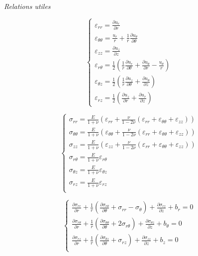 \documentclass
[
a4paper,                      %
twoside,					  %
12pt,                         %
abstract,		      %
fleqn,                        %
]
{scrartcl} %
\begin{document}
\textit{Relations utiles}

\begin{equation}
\begin{cases}
\varepsilon_{rr}=\frac{\partial u_{r}}{\partial r}\\
\varepsilon_{\theta\theta}=\frac{u_{r}}{r}+\frac{1}{r}\frac{\partial u_{\theta}}{\partial\theta}\\
\varepsilon_{zz}=\frac{\partial u_{z}}{\partial z}\\
\varepsilon_{r\theta}=\frac{1}{2}\left(\frac{1}{r}\frac{\partial u_{r}}{\partial \theta}+\frac{\partial u_{\theta}}{\partial r}-\frac{u_{\theta}}{r}\right)\\
\varepsilon_{\theta z}=\frac{1}{2}\left(\frac{1}{r}\frac{\partial u_{z}}{\partial\theta}+\frac{\partial u_{\theta}}{\partial z}\right)\\
\varepsilon_{rz}=\frac{1}{2}\left(\frac{\partial u_{z}}{\partial r}+\frac{\partial u_{r}}{\partial z}\right)
\end{cases}
\end{equation}

\begin{equation}
\begin{cases}
\sigma_{rr}=\frac{E}{1+\nu}\left(\varepsilon_{rr}+\frac{\nu}{1-2\nu}\left(\varepsilon_{rr}+\varepsilon_{\theta\theta}+\varepsilon_{zz}\right)\right)\\
\sigma_{\theta\theta}=\frac{E}{1+\nu}\left(\varepsilon_{\theta\theta}+\frac{\nu}{1-2\nu}\left(\varepsilon_{rr}+\varepsilon_{\theta\theta}+\varepsilon_{zz}\right)\right)\\
\sigma_{zz}=\frac{E}{1+\nu}\left(\varepsilon_{zz}+\frac{\nu}{1-2\nu}\left(\varepsilon_{rr}+\varepsilon_{\theta\theta}+\varepsilon_{zz}\right)\right)\\
\sigma_{r\theta}=\frac{E}{1+\nu}\varepsilon_{r\theta}\\
\sigma_{\theta z}=\frac{E}{1+\nu}\varepsilon_{\theta z}\\
\sigma_{r z}=\frac{E}{1+\nu}\varepsilon_{r z}\\
\end{cases}
\end{equation}

\begin{equation}
\begin{cases}
\frac{\partial\sigma_{rr}}{\partial r}+\frac{1}{r}\left(\frac{\partial\sigma_{r\theta}}{\partial\theta}+\sigma_{rr}-\sigma_{\theta}\right)+\frac{\partial\sigma_{rz}}{\partial z}+b_{r}=0\\
\frac{\partial\sigma_{r\theta}}{\partial r}+\frac{1}{r}\left(\frac{\partial\sigma_{\theta\theta}}{\partial\theta}+2\sigma_{r\theta}\right)+\frac{\partial\sigma_{\theta z}}{\partial z}+b_{\theta}=0\\
\frac{\partial\sigma_{rz}}{\partial r}+\frac{1}{r}\left(\frac{\partial\sigma_{\theta z}}{\partial\theta}+\sigma_{rz}\right)+\frac{\partial\sigma_{zz}}{\partial z}+b_{z}=0\\
\end{cases}
\end{equation}
\end{document}
